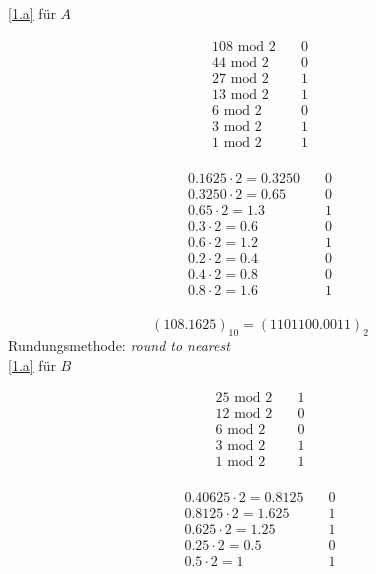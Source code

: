\documentclass[a4paper, margins=3cm, newpage]{homework}
\begin{document}
\begin{solution}
\ref{1.a} für \(A\) \\
\begin{minipage}{0.5\textwidth}
\begin{align*}
	108 \text{ mod } 2 \quad &0 \\
	44 \text{ mod } 2 \quad &0 \\
	27 \text{ mod } 2 \quad &1 \\
	13 \text{ mod } 2 \quad &1 \\
	6 \text{ mod } 2 \quad &0 \\
	3 \text{ mod } 2 \quad &1 \\
	1 \text{ mod } 2 \quad &1 \\
\end{align*}
\end{minipage}
\begin{minipage}{0.5\textwidth}
\begin{align*}
	0.1625 \cdot 2 = 0.3250 \quad & 0 \\
	0.3250 \cdot 2 = 0.65 \quad & 0 \\
	0.65 \cdot 2 = 1.3 \quad & 1 \\
	0.3 \cdot 2 = 0.6 \quad & 0 \\
	0.6 \cdot 2 = 1.2 \quad & 1 \\
	0.2 \cdot 2 = 0.4 \quad & 0 \\
	0.4 \cdot 2 = 0.8 \quad & 0 \\
	0.8 \cdot 2 = 1.6 \quad & 1 \\
\end{align*}
\end{minipage}

\[(108.1625)_{10} = (1101100.0011)_2\]
Rundungsmethode: \emph{round to nearest} \\

\ref{1.a} für \(B\) \\
\begin{minipage}{0.5\textwidth}
\begin{align*}
	25 \text{ mod } 2 \quad &1 \\
	12 \text{ mod } 2 \quad &0 \\
	6 \text{ mod } 2 \quad &0 \\
	3 \text{ mod } 2 \quad &1 \\
	1 \text{ mod } 2 \quad &1 \\
\end{align*}
\end{minipage}
\begin{minipage}{0.5\textwidth}
\begin{align*}
	0.40625 \cdot 2 = 0.8125 \quad & 0 \\
	0.8125 \cdot 2 = 1.625 \quad & 1 \\
	0.625 \cdot 2 = 1.25 \quad & 1 \\
	0.25 \cdot 2 = 0.5 \quad & 0 \\
	0.5 \cdot 2 = 1 \quad & 1 \\
\end{align*}
\end{minipage}


\end{solution}
\end{document}
